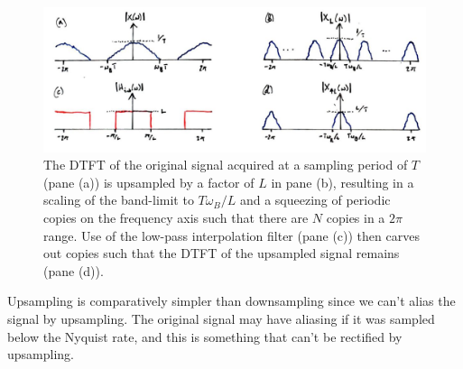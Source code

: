 \begin{figure}[!htb]
  \includegraphics[width=\textwidth]{images/lecture_14_upsample.JPG}
  \caption{The DTFT of the original signal acquired at a sampling period of $T$
    (pane (a)) is upsampled by a factor of $L$ in pane (b), resulting in a scaling
    of the band-limit to $T\omega_B/L$ and a squeezing of periodic copies on
    the frequency axis such that there are $N$ copies in a $2\pi$ range.
    Use of the low-pass interpolation filter (pane (c)) then carves out
    copies such that the DTFT of the upsampled signal remains (pane (d)).
  }
  \label{fig::lecture_14_upsample}
\end{figure}
%
Upsampling is comparatively simpler than downsampling since we can't alias the
signal by upsampling. The original signal may have aliasing if it was
sampled below the Nyquist rate, and this is something that can't be rectified
by upsampling.
